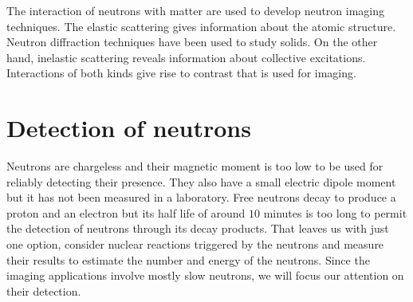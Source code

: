 \documentclass{article}
\numberwithin{equation}{section}
\begin{document}
The interaction of neutrons with matter are used to develop neutron imaging
techniques. The elastic scattering gives information about the atomic 
structure. Neutron diffraction techniques have been used to study solids. On
the other hand, inelastic scattering reveals information about collective
excitations. Interactions of both kinds give rise to contrast that is used
for imaging.

\section{Detection of neutrons}\label{s5}
Neutrons are chargeless and their magnetic moment is too low to be used for
reliably detecting their presence. They also have a small electric dipole 
moment but it has not been measured in a laboratory. Free neutrons decay to
produce a proton and an electron but its half life of around $10$ minutes is
too long to permit the detection of neutrons through its decay products. That
leaves us with just one option, consider nuclear reactions triggered by the
neutrons and measure their results to estimate the number and energy of the
neutrons. Since the imaging applications involve mostly slow neutrons, we will
focus our attention on their detection. 
\end{document}
